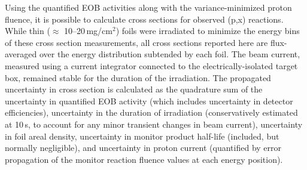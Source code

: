 Using the quantified EOB activities along with the variance-minimized proton fluence, it is possible to calculate 
cross sections for 
observed (p,x) reactions.
While thin ($\approx$ 10--20\,mg/cm$^2$)  foils were irradiated to minimize the energy bins of these cross section measurements, 
all cross sections reported here are flux-averaged  
over the energy distribution subtended by each foil.
The beam current, measured using a current integrator connected to the electrically-isolated target box, remained stable for the duration of the irradiation.
The propagated uncertainty in cross section is calculated as the quadrature sum of the uncertainty in quantified EOB activity (which includes uncertainty in detector efficiencies), uncertainty in the duration of irradiation (conservatively estimated at 10\,s, to account for any minor transient changes in beam current), uncertainty in foil areal density, uncertainty in monitor product half-life (included, but normally negligible),  and uncertainty in proton current (quantified by error propagation of the monitor reaction fluence values  at each energy position).




